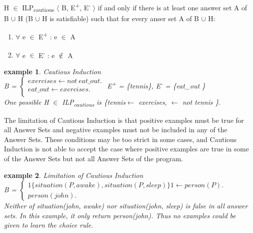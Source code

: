 \documentclass[12pt,twoside]{report}
\newtheorem{examp}{example}[section]
\begin{document}
 H $\in$ ILP\textsubscript{cautious} $\langle$ B, E\textsuperscript{+}, E\textsuperscript{-} $\rangle$ if and only if  there is at least one answer set A of B $\cup$ H (B $\cup$ H is satisfiable) such that for every anser set A of B $\cup$ H: \\
\begin{enumerate}
\item $\forall$ e $\in$ E\textsuperscript{+} : e $\in$ A
\item $\forall$ e $\in$ E\textsuperscript{-} : e $\notin$ A
\end{enumerate}

\begin{examp} \normalfont Cautious Induction \\

B = $\begin{cases}
	exercises  \leftarrow not \ eat\_out. \\
	eat\_out \leftarrow exercises. \\
      \end{cases}$ 
E\textsuperscript{+} = \{tennis\},      E\textsuperscript{-} = \{eat\_out \} \\

One possible  H $\in$ ILP\textsubscript{cautious} is \{tennis$ \leftarrow$ exercises, $\leftarrow$ not tennis \}.
\end{examp}
\label{cautious_induction_example}

The limitation of Cautious Induction is that positive examples must be true for all Answer Sets and negative examples must not be included in any of the Answer Sets. These conditions may be too strict in some cases, and Cautious Induction is not able to accept the case where positive examples are true in some of the Answer Sets but not all Answer Sets of the program.

\begin{examp} \normalfont Limitation of Cautious Induction \\

B = $\begin{cases}
	1\{situation(P, awake), situation(P, sleep)\}1 \leftarrow person(P). \\
	person(john).
      \end{cases}$ \\

Neither of situation(john, awake) nor situation(john, sleep) is false in all answer sets. In this example, it only return person(john). Thus no examples could be given to learn the choice rule.
\end{examp}
\end{document}
